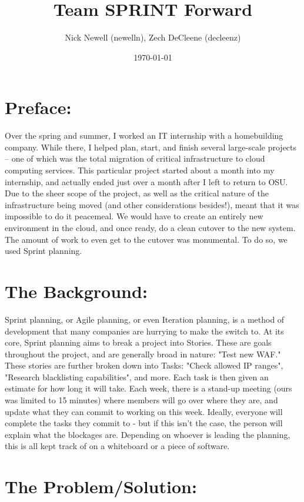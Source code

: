 \documentclass[12pt]{article}
\title{Team SPRINT Forward}
\author{Nick Newell (newelln), Zech DeCleene (decleenz)}
\date{\today}
\begin{document}
\maketitle


\section{Preface:}
 
        	 Over the spring and summer, I worked an IT internship with a homebuilding company. While there, I helped plan, start, and finish several large-scale projects – one of which was the total migration of critical infrastructure to cloud computing services. This particular project started about a month into my internship, and actually ended just over a month after I left to return to OSU. Due to the sheer scope of the project, as well as the critical nature of the infrastructure being moved (and other considerations besides!), meant that it was impossible to do it peacemeal. We would have to create an entirely new environment in the cloud, and once ready, do a clean cutover to the new system. The amount of work to even get to the cutover was monumental. To do so, we used Sprint planning.
 
 
\section{The Background:}
 
        	Sprint planning, or Agile planning, or even Iteration planning, is a method of development that many companies are hurrying to make the switch to. At its core, Sprint planning aims to break a project into Stories. These are goals throughout the project, and are generally broad in nature: "Test new WAF." These stories are further broken down into Tasks: "Check allowed IP ranges", "Research blacklisting capabilities", and more. Each task is then given an estimate for how long it will take. Each week, there is a stand-up meeting (ours was limited to 15 minutes) where members will go over where they are, and update what they can commit to working on this week. Ideally, everyone will complete the tasks they commit to - but if this isn't the case, the person will explain what the blockages are. Depending on whoever is leading the planning, this is all kept track of on a whiteboard or a piece of software.

        	
 
 
 
\section{The Problem/Solution:}
 
\end{document}
